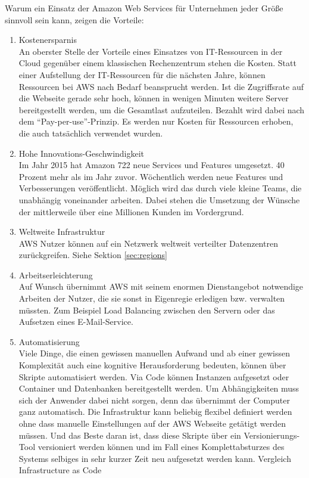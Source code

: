 {Warum ein Einsatz der Amazon Web Services für Unternehmen jeder Größe sinnvoll sein kann, zeigen die Vorteile:
\begin{enumerate}
  \item Kostenersparnis
  \\ An oberster Stelle der Vorteile eines Einsatzes von IT-Ressourcen in der Cloud gegenüber einem klassischen Rechenzentrum stehen die Kosten. Statt einer Aufstellung der IT-Ressourcen für die nächsten Jahre, können Ressourcen bei AWS nach Bedarf beansprucht werden. Ist die Zugriffsrate auf die Webseite gerade sehr hoch, können in wenigen Minuten weitere Server bereitgestellt werden, um die Gesamtlast aufzuteilen. Bezahlt wird dabei nach dem "`Pay-per-use"'-Prinzip. Es werden nur Kosten für Ressourcen erhoben, die auch tatsächlich verwendet wurden.
  \item Hohe Innovations-Geschwindigkeit
  \\ Im Jahr 2015 hat Amazon 722 neue Services und Features umgesetzt. 40 Prozent mehr als im Jahr zuvor. Wöchentlich werden neue Features und Verbesserungen veröffentlicht. Möglich wird das durch viele kleine Teams, die unabhängig voneinander arbeiten. Dabei stehen die Umsetzung der Wünsche der mittlerweile über eine Millionen Kunden im Vordergrund.
  \item Weltweite Infrastruktur
  \\ AWS Nutzer können auf ein Netzwerk weltweit verteilter Datenzentren zurückgreifen. Siehe Sektion \ref{sec:regions}
  \item Arbeitserleichterung
  \\ Auf Wunsch übernimmt AWS mit seinem enormen Dienstangebot notwendige Arbeiten der Nutzer, die sie sonst in Eigenregie erledigen bzw. verwalten müssten. Zum Beispiel Load Balancing zwischen den Servern oder das Aufsetzen eines E-Mail-Service.
  \item Automatisierung
  \\ Viele Dinge, die einen gewissen manuellen Aufwand und ab einer gewissen Komplexität auch eine kognitive Herausforderung bedeuten, können über Skripte automatisiert werden. Via Code können Instanzen aufgesetzt oder Container und Datenbanken bereitgestellt werden. Um Abhängigkeiten muss sich der Anwender dabei nicht sorgen, denn das übernimmt der Computer ganz automatisch. Die Infrastruktur kann beliebig flexibel definiert werden ohne dass manuelle Einstellungen auf der AWS Webseite getätigt werden müssen. Und das Beste daran ist, dass diese Skripte über ein Versionierungs-Tool versioniert werden können und im Fall eines Komplettabsturzes des Systems selbiges in sehr kurzer Zeit neu aufgesetzt werden kann. {\color{red}Vergleich Infrastructure as Code}

\end{enumerate}}
